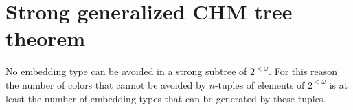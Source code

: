 %
%
%
%
%
%


\section{Strong generalized CHM tree theorem}

No embedding type can be avoided in a strong subtree of $2^{<\omega}$. For this reason the number of colors that cannot be avoided by $n$-tuples of elements of $2^{<\omega}$ is at least the number of embedding types that can be generated by these tuples.

